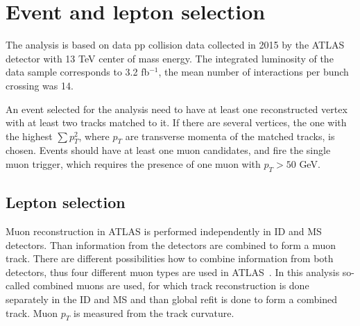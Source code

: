

\section{Event and lepton selection}
\label{sec:wprimeSelection}

The analysis is based on data pp collision data collected in 2015 by the ATLAS detector with 13 TeV center of mass energy.
The integrated luminosity of the data sample corresponds to 3.2 fb$^{-1}$, the mean number of interactions per bunch crossing was 14.

An event selected for the analysis need to have at least one reconstructed vertex with at least two tracks matched to it. 
If there are several vertices, the one with the highest
$\sum p^2_T$, where $p_T$ are transverse momenta of the matched tracks, is chosen.
Events should have at least one muon candidates, and fire the single muon trigger, 
which requires the presence of one muon with $p_T > 50$ GeV.

\subsection{Lepton selection}
Muon reconstruction in ATLAS is performed independently in ID and MS detectors. 
Than information from the detectors are combined to form a muon track.
There are different possibilities how to combine information from both detectors, 
thus four different muon types are used in ATLAS~\cite{muon_performance_2015}.
In this analysis so-called combined muons are used, for which track reconstruction is done 
separately in the ID and MS and than global refit is done to form a combined track.
Muon $p_T$ is measured from the track curvature.


